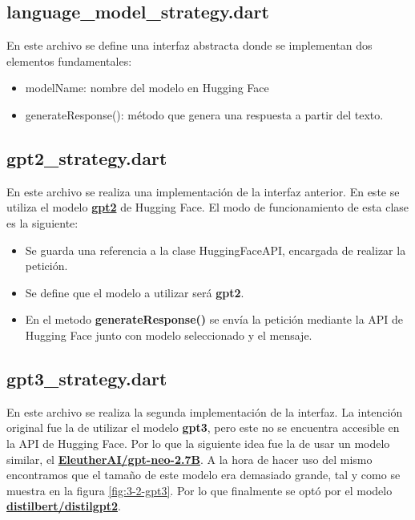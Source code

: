 \documentclass[12pt]{article}
\begin{document}
\subsection{language\_model\_strategy.dart}
En este archivo se define una interfaz abstracta donde se implementan dos elementos fundamentales:

\begin{itemize}
    \item modelName: nombre del modelo en Hugging Face
    \item generateResponse(): método que genera una respuesta a partir del texto.
\end{itemize}

\subsection{gpt2\_strategy.dart}
En este archivo se realiza una implementación de la interfaz anterior. En este se utiliza el modelo \href{https://huggingface.co/openai-community/gpt2}{\textbf{gpt2}} de Hugging Face. El modo de funcionamiento de esta clase es la siguiente:

\begin{itemize}
    \item Se guarda una referencia a la clase HuggingFaceAPI, encargada de realizar la petición.
    \item Se define que el modelo a utilizar será \textbf{gpt2}.
    \item En el metodo \textbf{generateResponse()} se envía la petición mediante la API de Hugging Face junto con modelo seleccionado y el mensaje.
\end{itemize}

\subsection{gpt3\_strategy.dart}

En este archivo se realiza la segunda implementación de la interfaz.
La intención original fue la de utilizar el modelo \textbf{gpt3}, pero este no se encuentra accesible en la API de Hugging Face. Por lo que la siguiente idea fue la de usar un modelo similar, el \href{https://huggingface.co/EleutherAI/gpt-neo-2.7B}{\textbf{EleutherAI/gpt-neo-2.7B}}.
A la hora de hacer uso del mismo encontramos que el tamaño de este modelo era demasiado grande, tal y como se muestra en la figura \ref{fig:3-2-gpt3}. Por lo que finalmente se optó por el modelo \href{https://huggingface.co/distilbert/distilgpt2}{\textbf{distilbert/distilgpt2}}.
\end{document}
